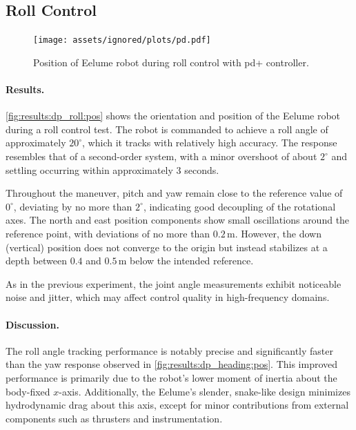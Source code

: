 \FloatBarrier

\subsection{Roll Control}

\begin{figure}[!ht]
    \centering
    \texttt{[image: assets/ignored/plots/pd.pdf]}
    \caption{Position of Eelume robot during roll control with \gls{pd+} controller.}
    \label{fig:results:dp_roll:pos}
\end{figure}

\paragraph{Results.}

\autoref{fig:results:dp_roll:pos} shows the orientation and position of the 
Eelume robot during a roll control test. The robot is commanded to achieve a 
roll angle of approximately \(20^\circ\), which it tracks with relatively high 
accuracy. The response resembles that of a second-order system, with a minor 
overshoot of about \(2^\circ\) and settling occurring within approximately
\(3\) seconds.

Throughout the maneuver, pitch and yaw remain close to the reference value of
\(0^\circ\), deviating by no more than \(2^\circ\), indicating good decoupling 
of the rotational axes. The north and east position components show small 
oscillations around the reference point, with deviations of no more than
\(0.2\,\mathrm{m}\). However, the down (vertical) position does not converge 
to the origin but instead stabilizes at a depth between \(0.4\) and
\(0.5\,\mathrm{m}\) below the intended reference.

As in the previous experiment, the joint angle measurements exhibit noticeable 
noise and jitter, which may affect control quality in high-frequency domains.

\paragraph{Discussion.}

The roll angle tracking performance is notably precise and significantly 
faster than the yaw response observed in \autoref{fig:results:dp_heading:pos}. 
This improved performance is primarily due to the robot’s lower moment of 
inertia about the body-fixed \(x\)-axis. Additionally, the Eelume’s slender, 
snake-like design minimizes hydrodynamic drag about this axis, except for 
minor contributions from external components such as thrusters and instrumentation.

